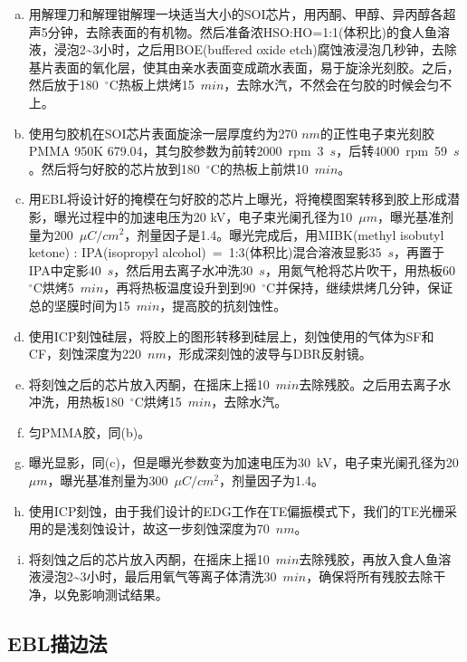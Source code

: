 \begin{enumerate}[(a)]
	\item
	用解理刀和解理钳解理一块适当大小的SOI芯片，用丙酮、甲醇、异丙醇各超声5分钟，去除表面的有机物。然后准备浓HSO:HO=1:1(体积比)的食人鱼溶液，浸泡2\~{}3小时，之后用BOE(buffered oxide etch)腐蚀液浸泡几秒钟，去除基片表面的氧化层，使其由亲水表面变成疏水表面，易于旋涂光刻胶。之后，然后放于180~$^{\circ}$C热板上烘烤15~$min$，去除水汽，不然会在匀胶的时候会匀不上。
	\item 
	使用匀胶机在SOI芯片表面旋涂一层厚度约为270 $nm$的正性电子束光刻胶PMMA 950K 679.04，其匀胶参数为前转2000~rpm~3~$s$，后转4000~rpm~59~$s$。然后将匀好胶的芯片放到180~$^{\circ}$C的热板上前烘10~$min$。
	\item
	用EBL将设计好的掩模在匀好胶的芯片上曝光，将掩模图案转移到胶上形成潜影，曝光过程中的加速电压为20 kV，电子束光阑孔径为10~$\mu m$，曝光基准剂量为200~$\mu C/cm^{2}$，剂量因子是1.4。曝光完成后，用MIBK(methyl isobutyl ketone) : IPA(isopropyl alcohol)~=~1:3(体积比)混合溶液显影35~$s$，再置于IPA中定影40~$s$，然后用去离子水冲洗30~$s$，用氮气枪将芯片吹干，用热板60~$^{\circ}$C烘烤5~$min$，再将热板温度设升到到90~$^{\circ}$C并保持，继续烘烤几分钟，保证总的坚膜时间为15~$min$，提高胶的抗刻蚀性。
	\item
	使用ICP刻蚀硅层，将胶上的图形转移到硅层上，刻蚀使用的气体为SF和CF，刻蚀深度为220~$nm$，形成深刻蚀的波导与DBR反射镜。
	\item 
	将刻蚀之后的芯片放入丙酮，在摇床上摇10~$min$去除残胶。之后用去离子水冲洗，用热板180~$^{\circ}$C烘烤15~$min$，去除水汽。
	\item 
	匀PMMA胶，同(b)。
	\item 
	曝光显影，同(c)，但是曝光参数变为加速电压为30~kV，电子束光阑孔径为20 $\mu m$，曝光基准剂量为300~$\mu C/cm^{2}$，剂量因子为1.4。
	\item 
	使用ICP刻蚀，由于我们设计的EDG工作在TE偏振模式下，我们的TE光栅采用的是浅刻蚀设计，故这一步刻蚀深度为70~$nm$。
	\item 
	将刻蚀之后的芯片放入丙酮，在摇床上摇10~$min$去除残胶，再放入食人鱼溶液浸泡2\~{}3小时，最后用氧气等离子体清洗30~$min$，确保将所有残胶去除干净，以免影响测试结果。
\end{enumerate}
\subsection{EBL描边法}

